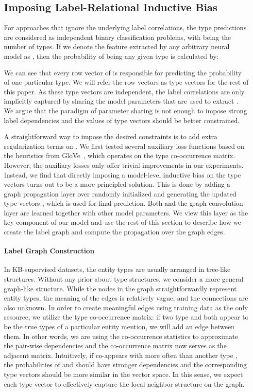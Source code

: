 \documentclass[11pt,a4paper]{article}
\begin{document}
\subsection{Imposing Label-Relational Inductive Bias}
For approaches that ignore the underlying label correlations, the type predictions are considered as  independent binary classification problems, with  being the number of types. If we denote the feature extracted by any arbitrary neural model as , then the probability of being any given type is calculated by:

We can see that every row vector of  is responsible for predicting the probability of one particular type. We will refer the row vectors as type vectors for the rest of this paper. As these type vectors are independent, the label correlations are only implicitly captured by sharing the model parameters that are used to extract . We argue that the paradigm of parameter sharing is not enough to impose strong label dependencies and the values of type vectors should be better constrained. 

A straightforward way to impose the desired constraints is to add extra regularization terms on . We first tested several auxiliary loss functions based on the heuristics from GloVe~\cite{pennington2014glove}, which operates on the type co-occurrence matrix. However, the auxiliary losses only offer trivial improvements in our experiments. Instead, we find that directly imposing a model-level inductive bias on the type vectors turns out to be a more principled solution. This is done by adding a graph propagation layer over randomly initialized  and generating the updated type vectors , which is used for final prediction. Both  and the graph convolution layer are learned together with other model parameters. We view this layer as the key component of our model and use the rest of this section to describe how we create the label graph and compute the propagation over the graph edges.

\paragraph{Label Graph Construction}
In KB-supervised datasets, the entity types are usually arranged in tree-like structures. Without any prior about type structures, we consider a more general graph-like structure. While the nodes in the graph straightforwardly represent entity types, the meaning of the edges is relatively vague, and the connections are also unknown. In order to create meaningful edges using training data as the only resource, we utilize the type co-occurrence matrix: if two type  and  both appear to be the true types of a particular entity mention, we will add an edge between them. In other words, we are using the co-occurrence statistics to approximate the pair-wise dependencies and the co-occurrence matrix now serves as the adjacent matrix. Intuitively, if  co-appears with  more often than another type , the probabilities of  and  should have stronger dependencies and the corresponding type vectors should be more similar in the vector space. In this sense, we expect each type vector to effectively capture the local neighbor structure on the graph.
\end{document}
